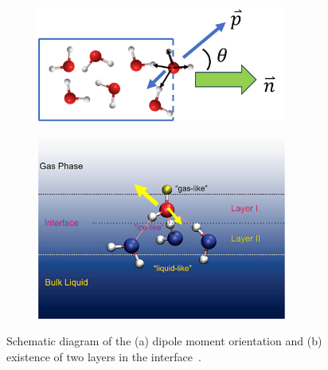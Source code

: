 \begin{figure}[tbhp!]
	\centering
	\begin{subfigure}{0.47\textwidth}
		\centering

		\includegraphics[width=0.9\textwidth]{images/dipole_scheme.png}
		\caption{}\label{fig:dipole_scheme}
	\end{subfigure}
	\hfill
	\begin{subfigure}{0.47\textwidth}
		\centering

		\includegraphics[width=0.9\textwidth]{images/dipole_expt.png}
		\caption{}\label{fig:dipole_expt}
	\end{subfigure}
	\caption{  Schematic diagram of the (a) dipole moment orientation and
		(b)		existence of two layers in the interface~\cite{fan2009structure}.}\label{fig:dipole_guide}
\end{figure}

